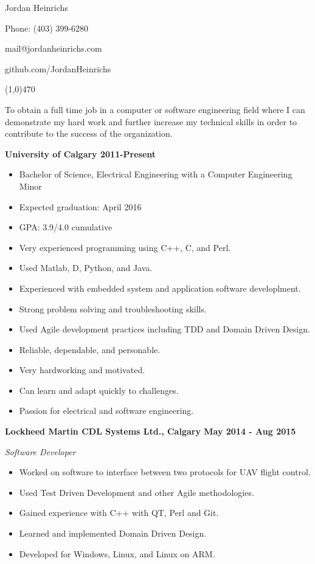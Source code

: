 \documentclass[12pt]{article}
\begin{document}

\centerline{{\Huge \sc Jordan Heinrichs}}
\centerline{Phone: (403) 399-6280}
\centerline{mail@jordanheinrichs.com}
\centerline{github.com/JordanHeinrichs}
\noindent
\line(1,0){470}\\

\medskip
{}
\medskip

\noindent To obtain a full time job in a computer or software engineering field where I can demonstrate my hard work and further increase my technical skills in order to contribute to the success of the organization.

\bigskip
{}
\medskip

\noindent \centerline{ \bf University of Calgary \hfill 2011-Present}
\begin{itemize}[parsep=0pt,partopsep=0pt]
  \item Bachelor of Science, Electrical Engineering with a Computer Engineering Minor
  \item Expected graduation: April 2016
  \item GPA: 3.9/4.0 cumulative
\end{itemize}

\bigskip
{}
\medskip
\begin{itemize}
\item Very experienced programming using C++, C, and Perl.
\item Used Matlab, D, Python, and Java.
\item Experienced with embedded system and application software developlment.
\item Strong problem solving and troubleshooting skills.
\item Used Agile development practices including TDD and Domain Driven Design.
\bigskip
\item Reliable, dependable, and personable.
\item Very hardworking and motivated.
\item Can learn and adapt quickly to challenges.
\item Passion for electrical and software engineering.
\end{itemize}
\noindent

\bigskip
{}
\medskip

\noindent \centerline{ \bf Lockheed Martin CDL Systems Ltd., Calgary \hfill May 2014 - Aug 2015}
\indent \emph{ Software Developer }
\begin{itemize}
  \item Worked on software to interface between two protocols for UAV flight control.
  \item Used Test Driven Development and other Agile methodologies.
  \item Gained experience with C++ with QT, Perl and Git.
  \item Learned and implemented Domain Driven Design.
  \item Developed for Windows, Linux, and Linux on ARM.
\end{itemize}
\end{document}
